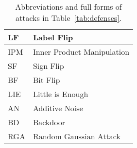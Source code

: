 \begin{table}[H]
\centering
\scriptsize
\caption{Abbreviations and full-forms of attacks in Table~\ref{tab:defenses}.}
\label{tab:full_names_attacks}
\begin{tabular}{|l|l|}
\hline
LF  & Label Flip                 \\ \hline
IPM & Inner Product Manipulation \\ \hline
SF  & Sign Flip                  \\ \hline
BF  & Bit Flip                   \\ \hline
LIE & Little is Enough           \\ \hline
AN  & Additive Noise             \\ \hline
BD  & Backdoor~\cite{bagdasaryan2018how} \\ \hline
RGA & Random Gaussian Attack \\ \hline
\end{tabular}
\end{table}